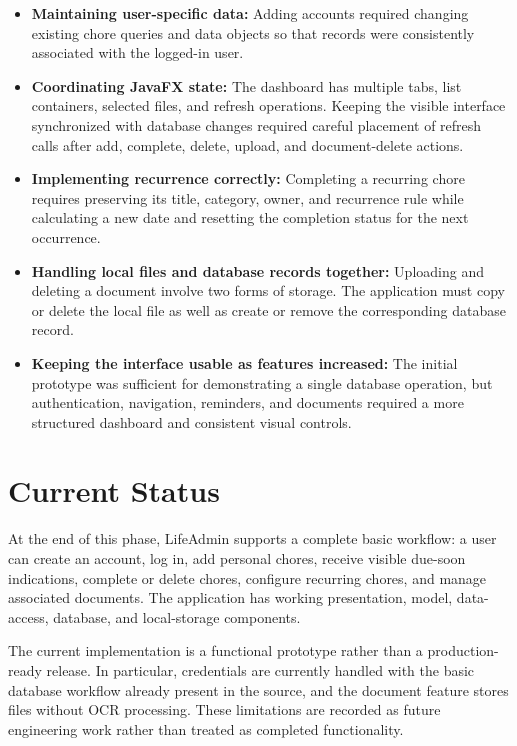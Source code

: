 \documentclass[11pt,a4paper]{article}
\begin{document}
\begin{itemize}[leftmargin=0.7cm]
    \item \textbf{Maintaining user-specific data:} Adding accounts required changing existing chore queries and data objects so that records were consistently associated with the logged-in user.

    \item \textbf{Coordinating JavaFX state:} The dashboard has multiple tabs, list containers, selected files, and refresh operations. Keeping the visible interface synchronized with database changes required careful placement of refresh calls after add, complete, delete, upload, and document-delete actions.

    \item \textbf{Implementing recurrence correctly:} Completing a recurring chore requires preserving its title, category, owner, and recurrence rule while calculating a new date and resetting the completion status for the next occurrence.

    \item \textbf{Handling local files and database records together:} Uploading and deleting a document involve two forms of storage. The application must copy or delete the local file as well as create or remove the corresponding database record.

    \item \textbf{Keeping the interface usable as features increased:} The initial prototype was sufficient for demonstrating a single database operation, but authentication, navigation, reminders, and documents required a more structured dashboard and consistent visual controls.
\end{itemize}

\section{Current Status}
At the end of this phase, LifeAdmin supports a complete basic workflow: a user can create an account, log in, add personal chores, receive visible due-soon indications, complete or delete chores, configure recurring chores, and manage associated documents. The application has working presentation, model, data-access, database, and local-storage components.

The current implementation is a functional prototype rather than a production-ready release. In particular, credentials are currently handled with the basic database workflow already present in the source, and the document feature stores files without OCR processing. These limitations are recorded as future engineering work rather than treated as completed functionality.
\end{document}
